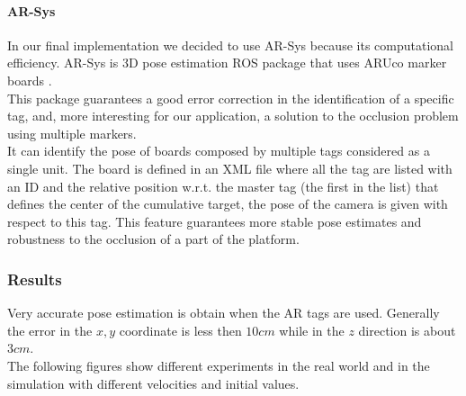 \paragraph{AR-Sys}
In our final implementation we decided to use AR-Sys because its computational efficiency. AR-Sys is 3D pose estimation ROS package that uses ARUco marker boards \cite{Aruco2014}.\\
This package guarantees a good error correction in the identification of a specific tag, and, more interesting for our application, a solution to the occlusion problem using multiple markers.\\
It can identify the pose of boards composed by multiple tags considered as a single unit. The board is defined in an XML file where all the tag are listed with an ID and the relative position w.r.t. the master tag (the first in the list) that defines the center of the cumulative target, the pose of the camera is given with respect to this tag. This feature guarantees more stable pose estimates and robustness to the occlusion of a part of the platform.

\subsubsection{Results}
Very accurate pose estimation is obtain when the AR tags are used. Generally the error in the $x,y$ coordinate is less then $10cm$ while in the $z$ direction is about $3cm$.\\

The following figures show different experiments in the real world and in the simulation with different velocities and initial values.\\

